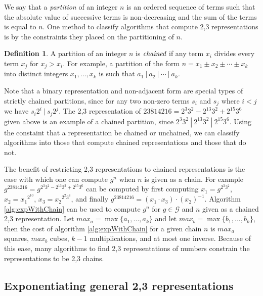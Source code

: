 \documentclass{ucalgthes1}
\theoremstyle{plain}
\theoremstyle{definition}
\newtheorem{defn}[thm]{Definition}
\begin{document}
We say that a \emph{partition} of an integer $n$ is an ordered sequence of terms such that the absolute value of successive terms is non-decreasing and the sum of the terms is equal to $n$.  One method to classify algorithms that compute 2,3 representations is by the constraints they placed on the partitioning of $n$.

\begin{defn}
A partition of an integer $n$ is $\emph{chained}$ if any term $x_i$ divides every term $x_j$ for $x_j > x_i$.  For example, a partition of the form $n = x_1 \pm x_2 \pm \cdots \pm x_k$ into distinct integers $x_1,\dots, x_k$ is such that $a_1 ~|~ a_2 ~|~ \cdots ~|~ a_k$.
\end{defn}

\noindent
Note that a binary representation and non-adjacent form are special types of strictly chained partitions, since for any two non-zero terms $s_i$ and $s_j$ where $i < j$ we have $s_i2^i ~|~ s_j2^j$.  The 2,3 representation of $23814216 = 2^3 3^2 - 2^{13} 3^2 + 2^{15} 3^6$ given above is an example of a chained partition, since $2^3 3^2 ~|~ 2^{13} 3^2 ~|~ 2^{15} 3^6$.  Using the constaint that a representation be chained or unchained, we can classify algorithms into those that compute chained representations and those that do not.

The benefit of restricting 2,3 representations to chained representations is the ease with which one can compute $g^n$ when $n$ is given as a chain.  For example $g^{23814216} = g^{2^3 3^2 - 2^{13} 3^2 + 2^{15} 3^6}$ can be computed by first computing $x_1 = g^{2^3 3^2}$, $x_2 = {x_1}^{2^{10}}$, $x_3 = {x_2}^{2^2 3^4}$, and finally $g^{23814216} = \left(x_1 \cdot x_3\right) \cdot \left(x_2\right)^{-1}$.  Algorithm \ref{alg:expWithChain} can be used to compute $g^n$ for $g \in \mathcal G$ and $n$ given as a chained 2,3 representation.  Let $max_a = \max \{a_1,...,a_k\}$ and let $max_b = \max \{b_1,...,b_k\}$, then the cost of algorithm \ref{alg:expWithChain} for a given chain $n$ is $max_a$ squares, $max_b$ cubes, $k-1$ multiplications, and at most one inverse. Because of this ease, many algorithms to find 2,3 representations of numbers constrain the representations to be 2,3 chains.


\bigbreak
\subsection{Exponentiating general 2,3 representations}
\end{document}
